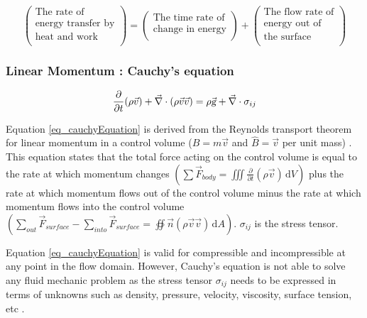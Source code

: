 \documentclass{article}
\newcommand{\ud}{\,\mathrm{d}}
\begin{document}
$$ \left(
    \begin{array}{c}
        \textrm{The rate of} \\
        \textrm{energy transfer by} \\
        \textrm{heat and work} \\
    \end{array}
\right) = \left(
    \begin{array}{c}
        \textrm{The time rate of} \\
        \textrm{change in energy} \\
    \end{array}
\right) + \left(
    \begin{array}{c}
        \textrm{The flow rate of} \\
        \textrm{energy out of} \\
        \textrm{the surface} \\
    \end{array}
\right) $$

\subsubsection*{Linear Momentum : Cauchy's equation}

\begin{equation}
\frac{\partial}{\partial t} (\rho \vec{v}) + \vec{\nabla} \cdot (\rho \vec{v} \vec{v}) = \rho \vec{\textsl{g}} + \vec{\nabla} \cdot \sigma_{ij}
\label{eq_cauchyEquation}
\end{equation}

Equation \ref{eq_cauchyEquation} is derived from the Reynolds transport theorem for linear momentum in a control volume ($B = m \vec{v}$ and $\hat{B} = \vec{v}$ per unit mass) \cite{White2011}. This equation states that the total force acting on the control volume is equal to the rate at which momentum changes $\displaystyle \left( \sum \vec{F}_{body} = \iiint \frac{\partial}{\partial t} (\rho \vec{v}) \ud V \right)$ plus the rate at which momentum flows out of the control volume minus the rate at which momentum flows into the control volume $\displaystyle \left( \sum_{out} \vec{F}_{surface} - \sum_{into} \vec{F}_{surface} = \oiint \vec{n} (\rho \vec{v} \vec{v}) \ud A \right)$. $\sigma_{ij}$ is the stress tensor.

Equation \ref{eq_cauchyEquation} is valid for compressible and incompressible at any point in the flow domain. However, Cauchy's equation is not able to solve any fluid mechanic problem as the stress tensor $\sigma_{ij}$ needs to be expressed in terms of unknowns such as density, pressure, velocity, viscosity, surface tension, etc \cite{White2011}.
\end{document}
